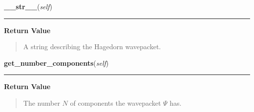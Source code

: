     \vspace{0.5ex}

\hspace{.8\funcindent}\begin{boxedminipage}{\funcwidth}

    \raggedright \textbf{\_\_str\_\_}(\textit{self})

    \vspace{-1.5ex}

    \rule{\textwidth}{0.5\fboxrule}
\setlength{\parskip}{2ex}
\setlength{\parskip}{1ex}
      \textbf{Return Value}
    \vspace{-1ex}

      \begin{quote}
      A string describing the Hagedorn wavepacket.

      \end{quote}

    \end{boxedminipage}

    \label{HagedornWavepacket:HagedornWavepacket:get_number_components}

    \vspace{0.5ex}

\hspace{.8\funcindent}\begin{boxedminipage}{\funcwidth}

    \raggedright \textbf{get\_number\_components}(\textit{self})

    \vspace{-1.5ex}

    \rule{\textwidth}{0.5\fboxrule}
\setlength{\parskip}{2ex}
\setlength{\parskip}{1ex}
      \textbf{Return Value}
    \vspace{-1ex}

      \begin{quote}
      The number $N$ of components the wavepacket $\Psi$
      has.

      \end{quote}

    \end{boxedminipage}

    \label{HagedornWavepacket:HagedornWavepacket:set_coefficients}

